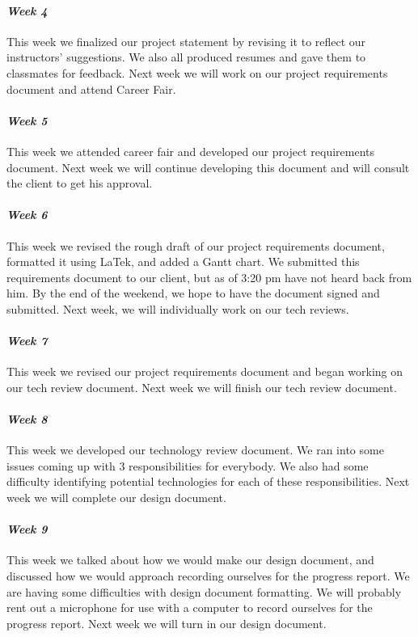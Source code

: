 \documentclass[onecolumn, draftclsnofoot,10pt, compsoc]{IEEEtran}
\begin{document}
\paragraph{\emph{Week 4}}
This week we finalized our project statement by revising it to reflect our instructors' suggestions. We also all produced resumes and gave them to classmates for feedback. Next week we will work on our project requirements document and attend Career Fair.
\paragraph{\emph{Week 5}}
This week we attended career fair and developed our project requirements document. Next week we will continue developing this document and will consult the client to get his approval.
\paragraph{\emph{Week 6}}
This week we revised the rough draft of our project requirements document, formatted it using LaTek, and added a Gantt chart. We submitted this requirements document to our client, but as of 3:20 pm have not heard back from him. By the end of the weekend, we hope to have the document signed and submitted. Next week, we will individually work on our tech reviews.
\paragraph{\emph{Week 7}}
This week we revised our project requirements document and began working on our tech review document. Next week we will finish our tech review document.
\paragraph{\emph{Week 8}}
This week we developed our technology review document. We ran into some issues coming up with 3 responsibilities for everybody. We also had some difficulty identifying potential technologies for each of these responsibilities. Next week we will complete our design document.
\paragraph{\emph{Week 9}}
This week we talked about how we would make our design document, and discussed how we would approach recording ourselves for the progress report. We are having some difficulties with design document formatting. We will probably rent out a microphone for use with a computer to record ourselves for the progress report. Next week we will turn in our design document.
\end{document}
